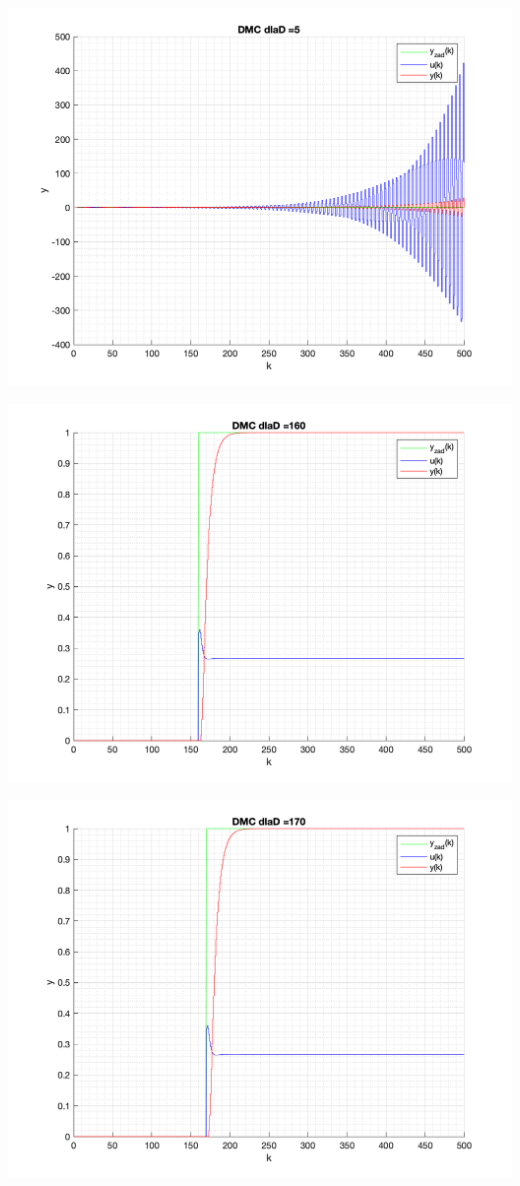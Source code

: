 \documentclass[a4paper, 11pt]{article}
\begin{document}
\begin{enumerate}
 \includegraphics[width=\linewidth]{./ModelsP4_D/P4_DMC_D_5_png.png} 
 
 \includegraphics[width=\linewidth]{./ModelsP4_D/P4_DMC_D_160_png.png} 
 
 \includegraphics[width=\linewidth]{./ModelsP4_D/P4_DMC_D_170_png.png} 
 

\end{enumerate}
\end{document}
